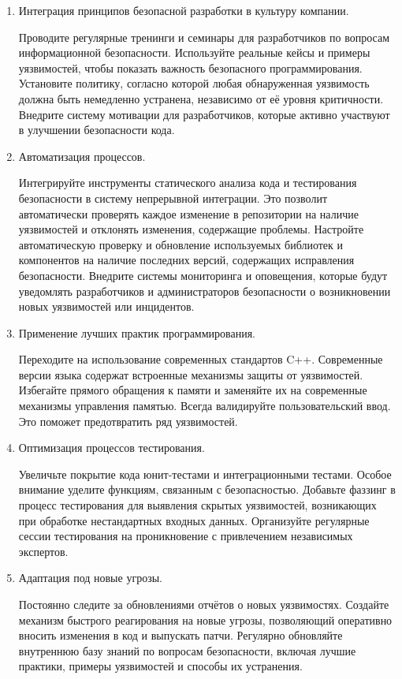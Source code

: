 \begin{enumerate}
    \item Интеграция принципов безопасной разработки в культуру компании.

    Проводите регулярные тренинги и семинары для разработчиков по вопросам информационной безопасности. Используйте реальные кейсы и примеры уязвимостей, чтобы показать важность безопасного программирования. Установите политику, согласно которой любая обнаруженная уязвимость должна быть немедленно устранена, независимо от её уровня критичности. Внедрите систему мотивации для разработчиков, которые активно участвуют в улучшении безопасности кода.

    \item Автоматизация процессов.

    Интегрируйте инструменты статического анализа кода и тестирования безопасности в систему непрерывной интеграции. Это позволит автоматически проверять каждое изменение в репозитории на наличие уязвимостей и отклонять изменения, содержащие проблемы.
    Настройте автоматическую проверку и обновление используемых библиотек и компонентов на наличие последних версий, содержащих исправления безопасности. Внедрите системы мониторинга и оповещения, которые будут уведомлять разработчиков и администраторов безопасности о возникновении новых уязвимостей или инцидентов.

    \item Применение лучших практик программирования.

    Переходите на использование современных стандартов C++. Современные версии языка содержат встроенные механизмы защиты от уязвимостей.
    Избегайте прямого обращения к памяти и заменяйте их на современные механизмы управления памятью. Всегда валидируйте пользовательский ввод. Это поможет предотвратить ряд уязвимостей.

    \item Оптимизация процессов тестирования.

    Увеличьте покрытие кода юнит-тестами и интеграционными тестами. Особое внимание уделите функциям, связанным с безопасностью.
    Добавьте фаззинг в процесс тестирования для выявления скрытых уязвимостей, возникающих при обработке нестандартных входных данных.
    Организуйте регулярные сессии тестирования на проникновение с привлечением независимых экспертов.

    \item Адаптация под новые угрозы.

    Постоянно следите за обновлениями отчётов о новых уязвимостях. Создайте механизм быстрого реагирования на новые угрозы, позволяющий оперативно вносить изменения в код и выпускать патчи. Регулярно обновляйте внутреннюю базу знаний по вопросам безопасности, включая лучшие практики, примеры уязвимостей и способы их устранения.

\end{enumerate}

